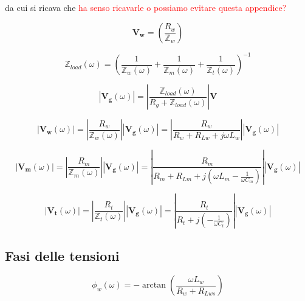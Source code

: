 \documentclass[12pt,italian]{article}
\newcommand{\err}[1]{\textcolor{red}{#1}}
\begin{document}
\noindent
da cui si ricava che \err{ha senso ricavarle o possiamo evitare questa appendice?}

\begin{equation}
  \mathbf{V_{w}} = \left( \frac{R_{w}}{\mathbb{Z}_{w}} \right)
\end{equation}

\begin{equation*}
  \mathbb{Z}_{load}(\omega) = \left(\frac{1}{\mathbb{Z}_{w}(\omega)} + \frac{1}{\mathbb{Z}_{m}(\omega)} + \frac{1}{\mathbb{Z}_{t}(\omega)}\right)^{-1}
\end{equation*}

\begin{equation}
  \left| \mathbf{V_{g}}(\omega) \right| = \left| \frac{\mathbb{Z}_{load}(\omega)}
  {R_{g}+\mathbb{Z}_{load}(\omega)}\right| \mathbf{V}
\end{equation}

\begin{equation}
  \left| \mathbf{V_{w}}(\omega) \right| = \left| \frac{R_{w}}
  {\mathbb{Z}_{w}(\omega)}\right|\left| \mathbf{V_{g}}(\omega) \right| = \left| \frac{R_{w}}
  {R_{w}+R_{Lw} + j \omega L_w}\right|\left| \mathbf{V_{g}}(\omega) \right|
\end{equation}

\begin{equation}
  \left| \mathbf{V_{m}}(\omega) \right| = \left| \frac{R_{m}}
  {\mathbb{Z}_{m}(\omega)}\right|\left| \mathbf{V_{g}}(\omega) \right| = \left| \frac{R_{m}}{R_{m}+R_{Lm} + j (\omega L_m - \frac{1}{\omega C_{m}})} \right| \left| \mathbf{V_{g}}(\omega) \right|
\end{equation}

\begin{equation}
  \left| \mathbf{V_{t}}(\omega) \right| = \left| \frac{R_{t}}
  {\mathbb{Z}_{t}(\omega)}\right|\left| \mathbf{V_{g}}(\omega) \right| = \left| \frac{R_{t}}{R_{t} + j (-\frac{1}{\omega C_{t}})}\right|\left| \mathbf{V_{g}}(\omega) \right|
\end{equation}

\subsection{Fasi delle tensioni}
\label{sec:fasi}

\begin{equation}
  \phi_{w}(\omega) = - \arctan\left(\frac{\omega L_{w}}{R_{w}+R_{Lws}}\right)
\end{equation}
\end{document}
